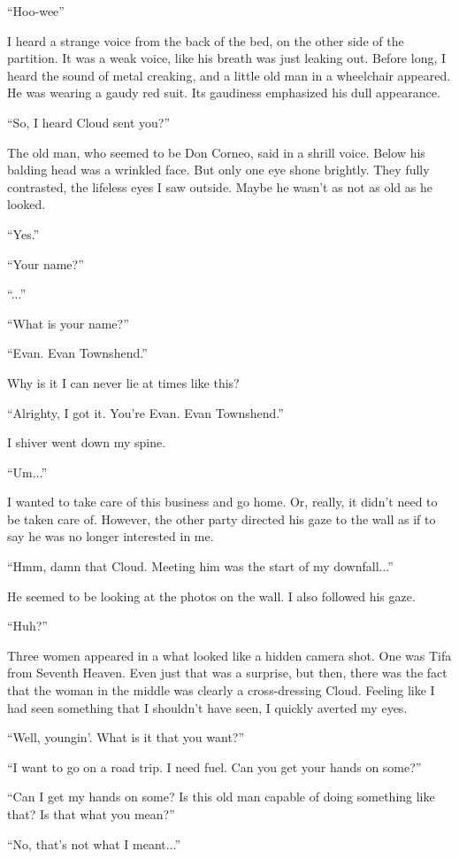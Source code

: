 \documentclass[oneside]{book}
\begin{document}
“Hoo-wee”

I heard a strange voice from the back of the bed, on the other side of the partition. It was a weak voice, like his breath was just leaking out. Before long, I heard the sound of metal creaking, and a little old man in a wheelchair appeared. He was wearing a gaudy red suit. Its gaudiness emphasized his dull appearance.

“So, I heard Cloud sent you?”

The old man, who seemed to be Don Corneo, said in a shrill voice. Below his balding head was a wrinkled face. But only one eye shone brightly. They fully contrasted, the lifeless eyes I saw outside. Maybe he wasn’t as not as old as he looked.

“Yes.”

“Your name?”

“...”

“What is your name?”

“Evan. Evan Townshend.”

Why is it I can never lie at times like this?

“Alrighty, I got it. You’re Evan. Evan Townshend.”

I shiver went down my spine.

“Um...”

I wanted to take care of this business and go home. Or, really, it didn’t need to be taken care of. However, the other party directed his gaze to the wall as if to say he was no longer interested in me.

“Hmm, damn that Cloud. Meeting him was the start of my downfall...”

He seemed to be looking at the photos on the wall. I also followed his gaze.

“Huh?”

Three women appeared in a what looked like a hidden camera shot. One was Tifa from Seventh Heaven. Even just that was a surprise, but then, there was the fact that the woman in the middle was clearly a cross-dressing Cloud. Feeling like I had seen something that I shouldn’t have seen, I quickly averted my eyes.

“Well, youngin’. What is it that you want?”

“I want to go on a road trip. I need fuel. Can you get your hands on some?”

“Can I get my hands on some? Is this old man capable of doing something like that? Is that what you mean?”

“No, that’s not what I meant...”
\end{document}
